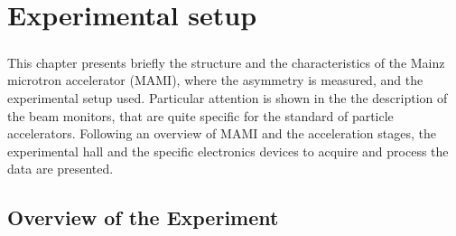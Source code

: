 \chapter{Experimental setup} 

\paragraph{} This chapter presents briefly the structure and the characteristics of the Mainz microtron accelerator (MAMI), where the \transv asymmetry is measured, and the experimental setup used. Particular attention is shown in the the description of the beam monitors, that are quite specific for the standard of particle accelerators. Following an overview of MAMI and the acceleration stages, the experimental hall and the specific electronics devices to acquire and process the data are presented. 

\section{Overview of the Experiment} \label{FirstDescription}

